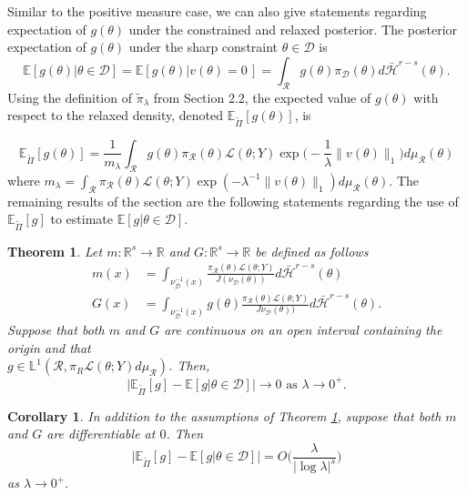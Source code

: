 \documentclass[10pt,fleqn]{article}
\newtheorem{theorem}{Theorem} \newtheorem{lemma}{Lemma}
\newtheorem{corollary}{Corollary} \newtheorem{remark}{Remark}
\newcommand{\bb}[1]{\mathbb{#1}} \newcommand{\mc}[1]{\mathcal{#1}}
\DeclareMathOperator{\1}{\mathbbm{1}} \DeclareMathOperator{\bigO}{\mc O}
\begin{document}
Similar to the positive measure case, we can also give statements regarding expectation of $g(\theta)$ under the constrained and relaxed posterior. The posterior expectation of $g(\theta)$ under the sharp constraint $\theta \in
\mathcal{D}$ is
$$\bb E[g(\theta) | \theta\in\mathcal{D}] = \bb E[g(\theta) |
v(\theta) =0\,] = \int_\mathcal{R} g(\theta) \pi_\mathcal{D}(\theta)
d\bar{\mathcal{H}}^{r-s}(\theta).$$
Using the definition of $\tilde{\pi}_\lambda$ from Section 2.2, the expected value of
$g(\theta)$ with respect to the relaxed density, denoted
$\bb E_{\tilde{\Pi}}[g(\theta)] $, is

$$\bb E_{\tilde{\Pi}}[g(\theta)] = \frac{1}{m_\lambda}
\int_\mathcal{R} g(\theta) \pi_\mathcal{R}(\theta)
\mathcal{L}(\theta;Y)\exp\bigg(-\frac{1}{\lambda}\|v (\theta)\|_1\bigg)
d\mu_\mathcal{R}(\theta) $$
where $m_\lambda =
\int_\mathcal{R}  \pi_\mathcal{R}(\theta)
\mathcal{L}(\theta;Y)\exp(-{\lambda^{-1}}\|v (\theta)\|_1)
d\mu_\mathcal{R}(\theta).$
The remaining results of the section are the following statements regarding
the use of $\bb E_{\tilde{\Pi}}[g]$ to estimate $\bb E[g|\theta\in\mathcal{D}]$.

\begin{theorem} \label{THM:Relaxed_Expectation_Convergence_Measure_Zero}
Let $m:\mathbb{R}^s\to \mathbb{R}$ and $G:\mathbb{R}^s\to
\mathbb{R}$ be defined as follows \begin{align*} m(x) & =
\int_{\nu_{\mc D}^{-1}(x)} \frac{\pi_\mathcal{R}(\theta)
\mathcal{L}(\theta;Y)}{J(\nu_{\mc D}(\theta))}
d\bar{\mathcal{H}}^{r-s}(\theta) \\ G(x) &= \int_{\nu_{\mc D}^{-1}(x)}
g(\theta)\frac{\pi_\mathcal{R}(\theta)
\mathcal{L}(\theta;Y)}{J\nu_{\mc D}(\theta))} d\bar{\mathcal{H}}^{r-s}(\theta).
\end{align*} Suppose that both $m$ and $G$ are continuous on an open
interval containing the origin and that \\
$g\in\mathbb{L}^1(\mathcal{R},\pi_R\mathcal{L}(\theta;Y)d\mu_\mathcal{R})$.
Then, $$\big|\bb E_{\tilde{\Pi}}[g] - \bb E[g|\theta \in \mathcal{D}]\big| \to 0
\text{ as } \lambda\to 0^+.$$ \end{theorem}

\begin{corollary} In addition to the assumptions of Theorem
\ref{THM:Relaxed_Expectation_Convergence_Measure_Zero}, suppose
that both $m$ and $G$ are differentiable at $0$. Then
$$\big|\bb E_{\tilde{\Pi}}[g] - \bb E[g|\theta \in \mathcal{D}] \big| =
O\bigg(\frac{\lambda}{|\log \lambda|^s}\bigg)$$ as $\lambda \to
0^+.$ 
\label{COR:Convergence_Rate_Measure_Zero}
\end{corollary}
\end{document}
